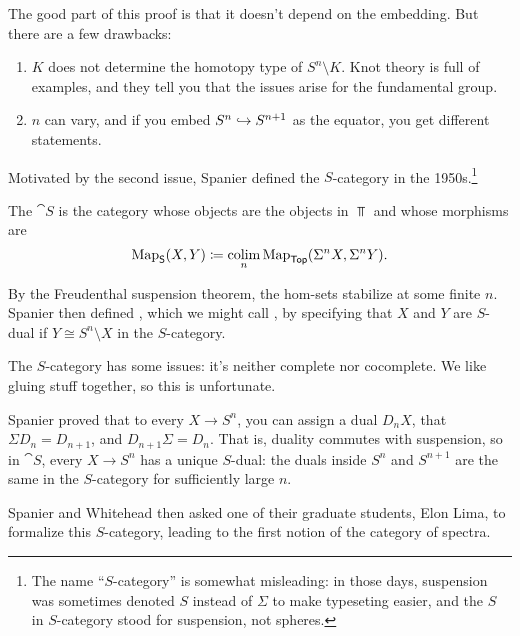 The good part of this proof is that it doesn't depend on the embedding. But there are a few drawbacks:
\begin{enumerate}
	\item $K$ does not determine the homotopy type of $S^n\setminus K$. Knot theory is full of examples, and they
	tell you that the issues arise for the fundamental group.
	\item $n$ can vary, and if you embed $S^n\hookrightarrow S^{n+1}$ as the equator, you get different statements.
\end{enumerate}
Motivated by the second issue, Spanier defined the $S$-category in the 1950s.\footnote{The name ``$S$-category'' is
somewhat misleading: in those days, suspension was sometimes denoted $S$ instead of $\Sigma$ to make typeseting
easier, and the $S$ in $S$-category stood for suspension, not spheres.}
\begin{defn}
The  $\cat S$ is the category whose objects are the objects in $\Top$ and whose morphisms are
\[\operatorname{Map}_{\mathsf S}(X, Y) \coloneqq \operatorname*{colim}_n\operatorname{Map}_\mathsf{Top}(\Sigma^n X, \Sigma^n Y).\]
\end{defn}
By the Freudenthal suspension theorem, the hom-sets stabilize at some finite $n$. Spanier then defined
, which we might call , by specifying that $X$ and $Y$ are
$S$-dual if $Y\cong S^n\setminus X$ in the $S$-category.
\begin{rem}
The $S$-category has some issues: it's neither complete nor cocomplete. We like gluing stuff together, so this is
unfortunate.
\end{rem}
Spanier proved that to every $X\to S^n$, you can assign a dual $D_n X$, that $\Sigma D_n = D_{n+1}$, and
$D_{n+1}\Sigma = D_n$. That is, duality commutes with suspension, so in $\cat S$, every $X\to S^n$ has a unique
$S$-dual: the duals inside $S^n$ and $S^{n+1}$ are the same in the $S$-category for sufficiently large $n$.

Spanier and Whitehead then asked one of their graduate students, Elon Lima, to formalize this $S$-category, leading
to the first notion of the category of spectra.
